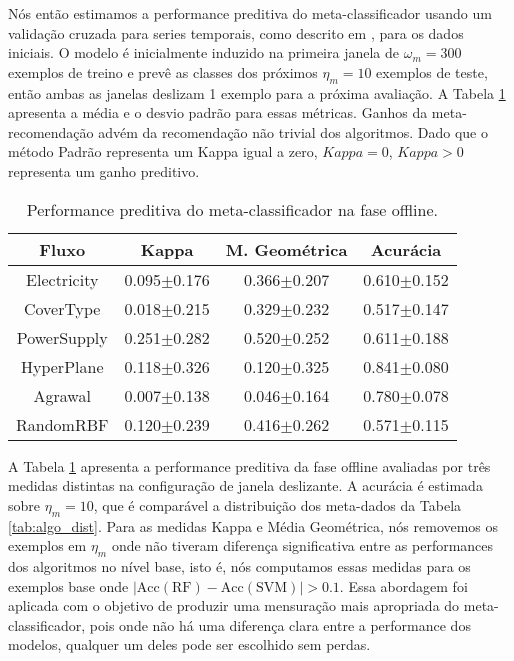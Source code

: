 Nós então estimamos a performance preditiva do meta-classificador usando um validação cruzada para series temporais, como descrito em \cite{hyndman2018forecasting}, para os dados iniciais. O modelo é inicialmente induzido na primeira janela de $\omega_m=300$ exemplos de treino e prevê as classes dos próximos $\eta_m=10$ exemplos de teste, então ambas as janelas deslizam 1 exemplo para a próxima avaliação. A Tabela \ref{tab:offmetrics} apresenta a média e o desvio padrão para essas métricas. Ganhos da meta-recomendação advém da recomendação não trivial dos algoritmos. Dado que o método Padrão representa um Kappa igual a zero, $Kappa=0$, $Kappa > 0$ representa um ganho preditivo.


\begin{table}[ht]
\caption{Performance preditiva do meta-classificador na fase offline.}
\label{tab:offmetrics}
\centering
\begin{tabular}{c|c|c|c}\hline
    Fluxo   & Kappa           & M. Geométrica   & Acurácia        \\ \hline
Electricity & 0.095$\pm$0.176 & 0.366$\pm$0.207 & 0.610$\pm$0.152 \\
CoverType   & 0.018$\pm$0.215 & 0.329$\pm$0.232 & 0.517$\pm$0.147 \\
PowerSupply & 0.251$\pm$0.282 & 0.520$\pm$0.252 & 0.611$\pm$0.188 \\ \hline
HyperPlane  & 0.118$\pm$0.326 & 0.120$\pm$0.325 & 0.841$\pm$0.080 \\
Agrawal     & 0.007$\pm$0.138 & 0.046$\pm$0.164 & 0.780$\pm$0.078 \\
RandomRBF   & 0.120$\pm$0.239 & 0.416$\pm$0.262 & 0.571$\pm$0.115 \\
\end{tabular}
\end{table}

A Tabela \ref{tab:offmetrics} apresenta a performance preditiva da fase offline avaliadas por três medidas distintas na configuração de janela deslizante. A acurácia é estimada sobre $\eta_m=10$, que é comparável a distribuição dos meta-dados da Tabela \ref{tab:algo_dist}. Para as medidas Kappa e Média Geométrica, nós removemos os exemplos em $\eta_m$ onde não tiveram diferença significativa entre as performances dos algoritmos no nível base, isto é, nós computamos essas medidas para os exemplos base onde $|\text{Acc}(\text{RF})-\text{Acc}(\text{SVM})| > 0.1$. Essa abordagem foi aplicada com o objetivo de produzir uma mensuração mais apropriada do meta-classificador, pois onde não há uma diferença clara entre a performance dos modelos, qualquer um deles pode ser escolhido sem perdas.

